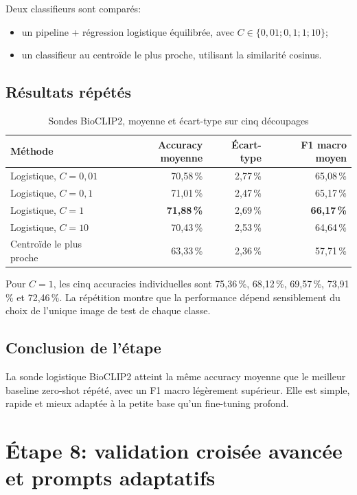 \documentclass[11pt,a4paper]{report}
\newcommand{\code}[1]{\texttt{\detokenize{#1}}}
\newcommand{\pct}[1]{#1\,\%}
\begin{document}
Deux classifieurs sont comparés:
\begin{itemize}
  \item un pipeline \code{StandardScaler} + régression logistique équilibrée,
  avec $C\in\{0{,}01;0{,}1;1;10\}$;
  \item un classifieur au centroïde le plus proche, utilisant la similarité cosinus.
\end{itemize}

\section{Résultats répétés}

\begin{table}[ht]
\centering
\caption{Sondes BioCLIP2, moyenne et écart-type sur cinq découpages}
\begin{tabular}{lrrr}
\toprule
Méthode & Accuracy moyenne & Écart-type & F1 macro moyen \\
\midrule
Logistique, $C=0{,}01$ & \pct{70,58} & \pct{2,77} & \pct{65,08} \\
Logistique, $C=0{,}1$ & \pct{71,01} & \pct{2,47} & \pct{65,17} \\
Logistique, $C=1$ & \textbf{\pct{71,88}} & \pct{2,69} & \textbf{\pct{66,17}} \\
Logistique, $C=10$ & \pct{70,43} & \pct{2,53} & \pct{64,64} \\
Centroïde le plus proche & \pct{63,33} & \pct{2,36} & \pct{57,71} \\
\bottomrule
\end{tabular}
\end{table}

Pour $C=1$, les cinq accuracies individuelles sont \pct{75,36}, \pct{68,12},
\pct{69,57}, \pct{73,91} et \pct{72,46}. La répétition montre que la performance
dépend sensiblement du choix de l'unique image de test de chaque classe.

\section{Conclusion de l'étape}

La sonde logistique BioCLIP2 atteint la même accuracy moyenne que le meilleur
baseline zero-shot répété, avec un F1 macro légèrement supérieur. Elle est simple,
rapide et mieux adaptée à la petite base qu'un fine-tuning profond.

\chapter{Étape 8: validation croisée avancée et prompts adaptatifs}
\end{document}
